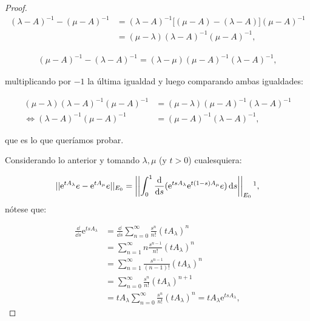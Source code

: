 \begin{proof}
    \begin{align*}
        (\lambda - A)^{-1} - (\mu - A)^{-1} &= (\lambda - A)^{-1}\big[(\mu - A) - (\lambda - A)\big](\mu - A)^{-1}\\
        &=(\mu - \lambda)(\lambda - A)^{-1}(\mu - A)^{-1},
    \end{align*}

    \begin{align*}
        (\mu-A)^{-1} - (\lambda - A)^{-1} = (\lambda - \mu)(\mu - A)^{-1}(\lambda - A)^{-1},
    \end{align*}

    multiplicando por $-1$ la última igualdad y luego comparando ambas igualdades:

    \begin{align*}
        (\mu - \lambda)(\lambda - A)^{-1}(\mu - A)^{-1} &= (\mu - \lambda)(\mu - A)^{-1}(\lambda - A)^{-1}\\
        \iff (\lambda - A)^{-1}(\mu - A)^{-1} &= (\mu - A)^{-1}(\lambda - A)^{-1},
    \end{align*}

    que es lo que queríamos probar.

    Considerando lo anterior y tomando $\lambda, \mu$ (y $t > 0$) cualesquiera:

    \begin{align*}
        ||\mathrm{e}^{tA_\lambda}e - \mathrm{e}^{tA_\mu}e||_{E_0} = \left | \left | \int_0^1 \frac{\dd}{\dd s}(\mathrm{e}^{tsA_\lambda}\mathrm{e}^{t(1-s)A_\mu}e) \, \dd s \right | \right |_{E_0}\footnotemark ,
    \end{align*}
    nótese que:

    \begin{align*}
        \frac{\dd}{\dd s} \mathrm{e}^{tsA_\lambda} &= \frac{\dd}{\dd s} \sum_{n = 0}^\infty \frac{s^n}{n!} (tA_\lambda)^n\\
        &= \sum_{n = 1}^\infty n \frac{s^{n-1}}{n!} (tA_\lambda)^n\\
        &= \sum_{n = 1}^\infty \frac{s^{n-1}}{(n-1)!} (tA_\lambda)^n\\
        &= \sum_{n=0}^\infty \frac{s^n}{n!} (tA_\lambda)^{n+1}\\
        &= tA_\lambda\sum_{n=0}^\infty \frac{s^n}{n!} (tA_\lambda)^{n} = tA_\lambda \mathrm{e}^{tsA_\lambda},
    \end{align*}


\end{proof}
